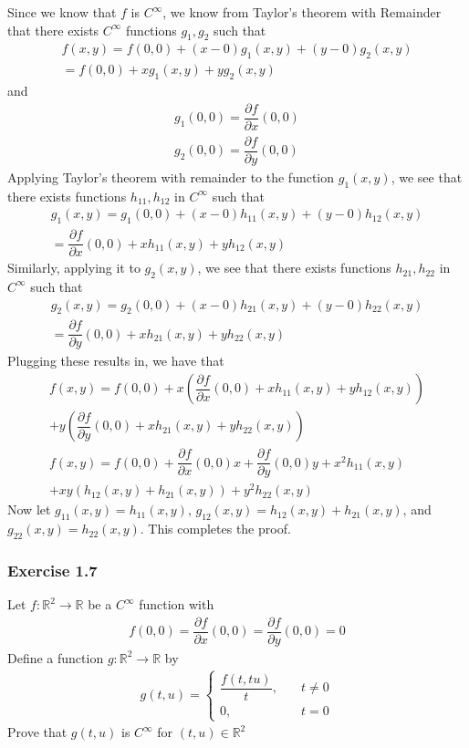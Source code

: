 \documentclass{article}
\newcommand{\R}{\mathbb{R}}
\begin{document}
	Since we know that $f$ is $C^{\infty}$, we know from Taylor's theorem with Remainder that there exists $C^{\infty}$ functions $g_1, g_2$ such that
	\begin{gather*}
		f(x, y) = f(0, 0) + (x - 0) g_1(x, y) + (y - 0) g_2(x, y) \\
		= f(0, 0) + x g_1(x, y) + y g_2(x, y)
	\end{gather*}
	and
	\begin{gather*}
		g_1(0, 0) = \dfrac{\partial f}{\partial x} (0, 0) \\
		g_2(0, 0) = \dfrac{\partial f}{\partial y} (0, 0)
	\end{gather*}
	Applying Taylor's theorem with remainder to the function $g_1(x, y)$, we see that there exists functions $h_{11}, h_{12}$ in $C^{\infty}$ such that
	\begin{gather*}
		g_1(x, y) = g_1(0, 0) + (x - 0) h_{11}(x, y) + (y - 0) h_{12}(x, y) \\
		= \dfrac{\partial f}{\partial x} (0, 0) + x h_{11}(x, y) + y h_{12}(x, y)
	\end{gather*}
	Similarly, applying it to $g_2(x, y)$, we see that there exists functions $h_{21}, h_{22}$ in $C^{\infty}$ such that
	\begin{gather*}
		g_2(x, y) = g_2(0, 0) + (x - 0) h_{21}(x, y) + (y - 0) h_{22}(x, y) \\
		= \dfrac{\partial f}{\partial y} (0, 0) + x h_{21}(x, y) + y h_{22}(x, y)
	\end{gather*}
	Plugging these results in, we have that
	\begin{gather*}
		f(x, y) = f(0, 0) + x \left( \dfrac{\partial f}{\partial x} (0, 0) + x h_{11}(x, y) + y h_{12}(x, y) \right) \\
		+ y \left( \dfrac{\partial f}{\partial y} (0, 0) + x h_{21}(x, y) + y h_{22}(x, y) \right) \\
		f(x, y) = f(0, 0) + \dfrac{\partial f}{\partial x} (0, 0) x + \dfrac{\partial f}{\partial y} (0, 0) y + x^2 h_{11}(x, y)
		\\ + xy \left( h_{12}(x, y) + h_{21}(x, y) \right) + y^2 h_{22}(x, y)
	\end{gather*}
	Now let $g_{11}(x, y) = h_{11}(x, y)$, $g_{12}(x, y) = h_{12}(x, y) + h_{21}(x, y)$, and $g_{22}(x, y) = h_{22}(x, y)$. This completes the proof.

	
	\subsubsection*{Exercise 1.7}
	Let $f: \R^2 \to \R$ be a $C^{\infty}$ function with
	\begin{gather*}
		f(0, 0) = \dfrac{\partial f}{\partial x}(0, 0) = \dfrac{\partial f}{\partial y}(0, 0) = 0
	\end{gather*}
	Define a function $g: \R^2 \to \R$ by
	\begin{gather*}
		g(t, u) = \begin{cases}
			\dfrac{f(t, tu)}{t}, \quad &t \neq 0 \\
			0, \quad &t = 0
		\end{cases}
	\end{gather*}
	Prove that $g(t, u)$ is $C^{\infty}$ for $(t, u) \in \R^2$
	
\end{document}

